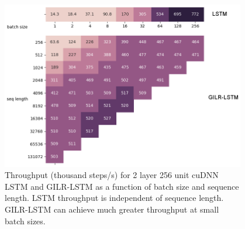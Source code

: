 \documentclass[final]{beamer}
\newlength{\sepwid}
\newlength{\onecolwid}
\begin{document}
\begin{frame}[t]
\begin{columns}[t]
\begin{column}{\onecolwid}
\vspace{-1ex}
\begin{figure}
\includegraphics[width=0.9\linewidth]{cudnn_heatmap_gilr.png}
\caption{Throughput (thousand steps/s) for 2 layer 256 unit cuDNN LSTM and GILR-LSTM as
a function of batch size and sequence length. LSTM throughput is independent of sequence
length. GILR-LSTM can achieve much greater throughput at small batch sizes.}
\end{figure}


\end{column} %








\begin{column}{\sepwid}\end{column} %


\end{columns}
\end{frame}
\end{document}
